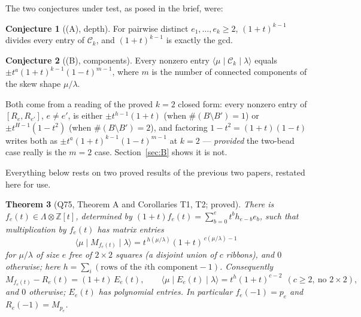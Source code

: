 \documentclass[11pt]{article}
\newtheorem{theorem}{Theorem}
\theoremstyle{definition}
\newtheorem{conjecture}[theorem]{Conjecture}
\newcommand{\Lam}{\Lambda}
\newcommand{\Z}{\mathbb{Z}}
\newcommand{\Ck}{\mathcal{C}}
\begin{document}
The two conjectures under test, as posed in the brief, were:

\begin{conjecture}[(A), depth]\label{conj:A}
For pairwise distinct $e_1,\dots,e_k\ge2$, $(1+t)^{k-1}$ divides every entry of $\Ck_k$, and
$(1+t)^{k-1}$ is exactly the gcd.
\end{conjecture}

\begin{conjecture}[(B), components]\label{conj:B}
Every nonzero entry $\langle\mu\mid \Ck_k\mid\lambda\rangle$ equals
$\pm t^a(1+t)^{k-1}(1-t)^{m-1}$, where $m$ is the number of connected components of the skew shape
$\mu/\lambda$.
\end{conjecture}

Both come from a reading of the proved $k=2$ closed form: every nonzero entry of
$[R_e,R_{e'}]$, $e\ne e'$, is either $\pm t^{h-1}(1+t)$ (when $\#(B\setminus B')=1$) or
$\pm t^{H-1}(1-t^2)$ (when $\#(B\setminus B')=2$), and factoring $1-t^2=(1+t)(1-t)$ writes both as
$\pm t^a(1+t)^{k-1}(1-t)^{m-1}$ at $k=2$ --- \emph{provided} the two-bead case really is the
$m=2$ case. Section~\ref{sec:B} shows it is not.

\medskip
Everything below rests on two proved results of the previous two papers, restated here for use.

\begin{theorem}[Q75, Theorem A and Corollaries T1, T2; proved]\label{thm:Q75}
There is $f_e(t)\in\Lam\otimes\Z[t]$, determined by $(1+t)f_e(t)=\sum_{b=0}^{e}t^b h_{e-b}e_b$,
such that multiplication by $f_e(t)$ has matrix entries
\[
\langle\mu\mid M_{f_e(t)}\mid\lambda\rangle=t^{\,h(\mu/\lambda)}(1+t)^{\,c(\mu/\lambda)-1}
\]
for $\mu/\lambda$ of size $e$ free of $2\times2$ squares (a disjoint union of $c$ ribbons), and
$0$ otherwise; here $h=\sum_i(\text{rows of the $i$th component}-1)$. Consequently
\[
M_{f_e(t)}-R_e(t)=(1+t)\,E_e(t),\qquad
\langle\mu\mid E_e(t)\mid\lambda\rangle=t^{h}(1+t)^{c-2}
\ \ (c\ge2,\ \text{no }2\times2),
\]
and $0$ otherwise; $E_e(t)$ has polynomial entries. In particular $f_e(-1)=p_e$ and
$R_e(-1)=M_{p_e}$.
\end{theorem}
\end{document}
